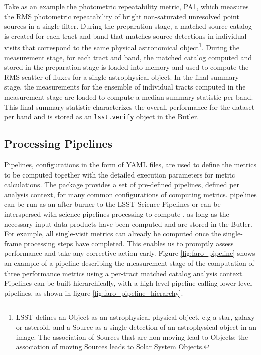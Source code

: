 Take as an example the photometric repeatability metric, PA1, which measures the RMS photometric repeatability of bright non-saturated unresolved point sources in a single filter.
During the preparation stage, a matched source catalog is created for each tract and band that matches source detections in individual visits that correspond to the same physical astronomical object\footnote{LSST defines an Object as an astrophysical physical object, e.g a star, galaxy or asteroid, and a Source as a  single detection of an astrophysical object in an image. The association of Sources that are non-moving lead to Objects; the association of moving Sources leads to Solar System Objects.}. 
During the measurement stage, for each tract and band, the matched catalog computed and stored in the preparation stage is loaded into memory and used to compute the RMS scatter of fluxes for a single astrophysical object. 
In the final summary stage, the measurements for the ensemble of individual tracts computed in the measurement stage are loaded to compute a median summary statistic per band. 
This final summary statistic characterizes the overall performance for the dataset per band and is stored as an \texttt{lsst.verify} object in the Butler. 

\subsection{Processing Pipelines} \label{ssec:pipelines}

Pipelines, configurations in the form of YAML files, are used to define the \faro metrics to be computed together with the  detailed execution parameters for metric calculations. 
The \faro package provides a set of pre-defined pipelines, defined per analysis context, for many common configurations of computing metrics. 
\faro pipelines can be run as an after burner to the LSST Science Pipelines or can be interspersed with science pipelines processing to compute , as long as the necessary input data products have been computed and are stored in the Butler.  
For example, all single-visit metrics can already be computed once the single-frame processing steps have completed. 
This enables us to promptly assess performance and take any corrective action early. 
Figure \ref{fig:faro_pipeline} shows an example of a \faro pipeline describing the measurement stage of the computation of three performance metrics  using a per-tract matched catalog analysis context.
Pipelines can be built hierarchically, with a high-level pipeline calling lower-level pipelines, as shown in figure \ref{fig:faro_pipeline_hierarchy}.

